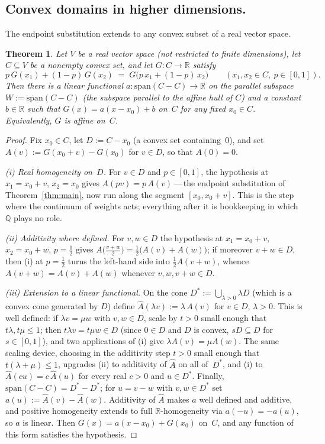\documentclass{article}
\theoremstyle{plain}
\newtheorem{theorem}{Theorem}
\theoremstyle{definition}
\newcommand{\R}{\mathbb{R}}
\newcommand{\Q}{\mathbb{Q}}
\begin{document}
\subsection{Convex domains in higher dimensions.}
\label{ssec:higher}

The endpoint substitution extends to any convex subset of a real vector
space.

\begin{theorem}\label{thm:higher}
Let $V$ be a real vector space (not restricted to finite dimensions), let
$C\subseteq V$ be a nonempty convex set, and let $G\colon C\to\R$ satisfy
\[
p\,G(x_1)+(1-p)\,G(x_2) \;=\;
G\bigl(p\,x_1+(1-p)\,x_2\bigr) \qquad (x_1,x_2\in C,\ p\in[0,1]).
\]
Then there is a linear functional $a\colon\mathrm{span}(C-C)\to\R$ on the
parallel subspace $W := \mathrm{span}(C-C)$ (the subspace parallel to the
affine hull of $C$) and a constant $b\in\R$ such that $G(x)=a(x-x_0)+b$
on~$C$ for any fixed $x_0\in C$. Equivalently, $G$ is affine on~$C$.
\end{theorem}

\begin{proof}
Fix $x_0\in C$, let $D:=C-x_0$ (a convex set containing~$0$), and set
$A(v):=G(x_0+v)-G(x_0)$ for $v\in D$, so that $A(0)=0$.

\emph{(i) Real homogeneity on~$D$.} For $v\in D$ and $p\in[0,1]$, the
hypothesis at $x_1=x_0+v$, $x_2=x_0$ gives $A(pv)=p\,A(v)$\,---\,the
endpoint substitution of Theorem~\ref{thm:main}, now run along the
segment $[x_0,x_0+v]$. This is the step where the continuum of weights
acts; everything after it is bookkeeping in which $\Q$ plays no role.

\emph{(ii) Additivity where defined.} For $v,w\in D$ the hypothesis at
$x_1=x_0+v$, $x_2=x_0+w$, $p=\tfrac12$ gives
$A\bigl(\tfrac{v+w}{2}\bigr)=\tfrac12\bigl(A(v)+A(w)\bigr)$; if
moreover $v+w\in D$, then (i) at $p=\tfrac12$ turns the left-hand side
into $\tfrac12 A(v+w)$, whence $A(v+w)=A(v)+A(w)$ whenever
$v,w,v+w\in D$.

\emph{(iii) Extension to a linear functional.} On the cone
$D^{\ast}:=\bigcup_{\lambda>0}\lambda D$ (which is a convex cone generated
by $D$) define $\hat A(\lambda v):=\lambda\,A(v)$ for $v\in D$, $\lambda>0$. This is
well defined: if $\lambda v=\mu w$ with $v,w\in D$, scale by $t>0$
small enough that $t\lambda,t\mu\le1$; then $t\lambda v=t\mu w\in D$
(since $0\in D$ and $D$ is convex, $sD\subseteq D$ for $s\in[0,1]$),
and two applications of (i) give $\lambda A(v)=\mu A(w)$. The same
scaling device, choosing in the additivity step $t>0$ small enough that $t(\lambda+\mu)\le1$, upgrades (ii) to additivity of $\hat A$ on all
of~$D^{\ast}$, and (i) to $\hat A(cu)=c\,\hat A(u)$ for every real
$c>0$ and $u\in D^{\ast}$. Finally,
$\mathrm{span}(C-C)=D^{\ast}-D^{\ast}$; for $u=v-w$ with
$v,w\in D^{\ast}$ set $a(u):=\hat A(v)-\hat A(w)$. Additivity of
$\hat A$ makes $a$ well defined and additive, and positive homogeneity
extends to full $\R$-homogeneity via $a(-u)=-a(u)$, so $a$ is linear.
Then $G(x)=a(x-x_0)+G(x_0)$ on~$C$, and any function of this form
satisfies the hypothesis.
\end{proof}
\end{document}
